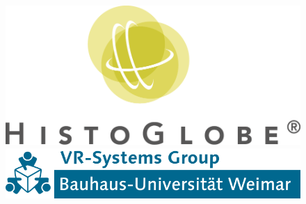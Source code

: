 \begin{titlepage}
\vfill
\begin{figure}[htbp]
  \centering
  \begin{minipage}[H]{0.35\textwidth}
    \includegraphics[width=1.0\textwidth]{graphics/HG_logo.png}
  \end{minipage}
  \hspace{0.2\textwidth}
  \begin{minipage}[H]{0.35\textwidth}
    \includegraphics[width=1.0\textwidth]{graphics/VR_logo.png}
  \end{minipage}
\end{figure}


\date{\today} %

\vfill %

\end{titlepage}
